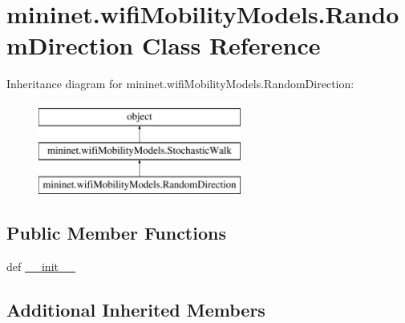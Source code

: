 \hypertarget{classmininet_1_1wifiMobilityModels_1_1RandomDirection}{\section{mininet.\-wifi\-Mobility\-Models.\-Random\-Direction Class Reference}
\label{classmininet_1_1wifiMobilityModels_1_1RandomDirection}
}
Inheritance diagram for mininet.\-wifi\-Mobility\-Models.\-Random\-Direction\-:\begin{figure}[H]
\begin{center}
\leavevmode
\includegraphics[height=3.000000cm]{classmininet_1_1wifiMobilityModels_1_1RandomDirection}
\end{center}
\end{figure}
\subsection*{Public Member Functions}
\begin{DoxyCompactItemize}
\item 
def \hyperlink{classmininet_1_1wifiMobilityModels_1_1RandomDirection_af539c766498fe00c98abf6c2de913498}{\-\_\-\-\_\-init\-\_\-\-\_\-}
\end{DoxyCompactItemize}
\subsection*{Additional Inherited Members}


